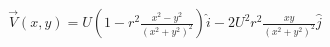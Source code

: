 \documentclass[preview]{standalone}
\begin{document}
\begin{align*}
\vec{V}(x,y)=U\left(1-r^2\frac{x^2-y^2}{(x^2+y^2)^2}\right)\hat{i}-2U^2r^2\frac{xy}{(x^2+y^2)^2}\hat{j}
\end{align*}
\end{document}

